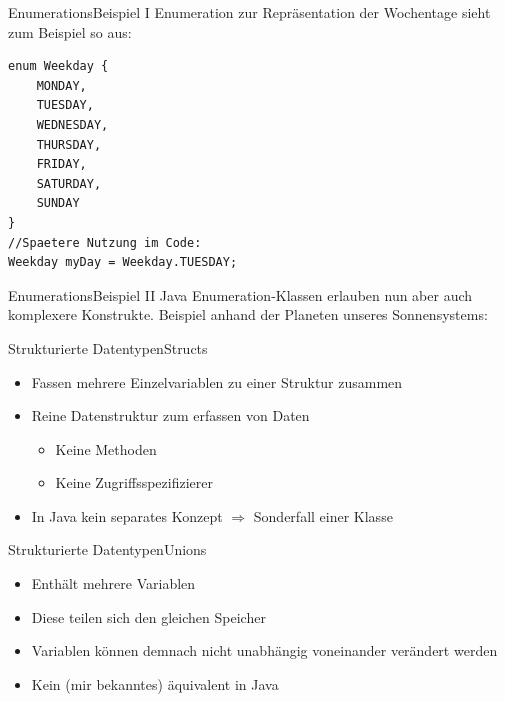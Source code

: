 \begin{frame}[fragile]{Enumerations}{Beispiel I}
Enumeration zur Repräsentation der Wochentage sieht zum Beispiel so aus:
\lstset{style=javacode}
\begin{lstlisting}
enum Weekday {
    MONDAY,
    TUESDAY,
    WEDNESDAY,
    THURSDAY,
    FRIDAY,
    SATURDAY,
    SUNDAY
}
//Spaetere Nutzung im Code:
Weekday myDay = Weekday.TUESDAY;
\end{lstlisting}
\end{frame}

\begin{frame}{Enumerations}{Beispiel II}
Java Enumeration-Klassen erlauben nun aber auch komplexere Konstrukte. Beispiel anhand der Planeten unseres Sonnensystems:
\end{frame}

\begin{frame}{Strukturierte Datentypen}{Structs}
	\begin{itemize}
		\item Fassen mehrere Einzelvariablen zu einer Struktur zusammen
		\item Reine Datenstruktur zum erfassen von Daten
		\begin{itemize}
			\item Keine Methoden
			\item Keine Zugriffsspezifizierer
		\end{itemize}
		\item In Java kein separates Konzept $\Rightarrow$ Sonderfall einer Klasse
	\end{itemize}
\end{frame}

\begin{frame}{Strukturierte Datentypen}{Unions}
	\begin{itemize}
		\item Enthält mehrere Variablen
		\item Diese teilen sich den gleichen Speicher
		\item Variablen können demnach nicht unabhängig voneinander verändert werden
		\item Kein (mir bekanntes) äquivalent in Java
	\end{itemize}
\end{frame}
